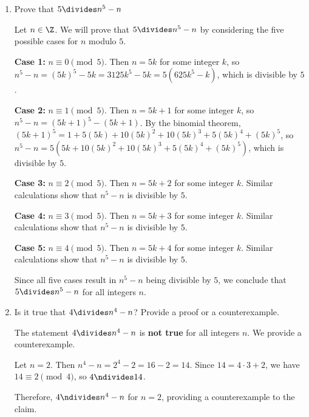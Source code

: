 \begin{enumerate}
\begin{enumerate}
\begin{subanswer}
      Since all three cases result in $n^{3} - n$ being divisible by $3$, we conclude that $3 \divides n^{3} - n$ for all integers $n$.
    \end{subanswer}
    
    \item Prove that $5\divides n^{5}-n$
    \begin{subanswer}
      Let $n \in \Z$. We will prove that $5 \divides n^{5} - n$ by considering the five possible cases for $n$ modulo $5$.
      
      \textbf{Case 1:} $n \equiv 0 \pmod{5}$. Then $n = 5k$ for some integer $k$, so $n^{5} - n = (5k)^{5} - 5k = 3125k^{5} - 5k = 5(625k^{5} - k)$, which is divisible by $5$.
      
      \textbf{Case 2:} $n \equiv 1 \pmod{5}$. Then $n = 5k + 1$ for some integer $k$, so $n^{5} - n = (5k + 1)^{5} - (5k + 1)$. By the binomial theorem, $(5k + 1)^{5} = 1 + 5(5k) + 10(5k)^{2} + 10(5k)^{3} + 5(5k)^{4} + (5k)^{5}$, so $n^{5} - n = 5(5k + 10(5k)^{2} + 10(5k)^{3} + 5(5k)^{4} + (5k)^{5})$, which is divisible by $5$.
      
      \textbf{Case 3:} $n \equiv 2 \pmod{5}$. Then $n = 5k + 2$ for some integer $k$. Similar calculations show that $n^{5} - n$ is divisible by $5$.
      
      \textbf{Case 4:} $n \equiv 3 \pmod{5}$. Then $n = 5k + 3$ for some integer $k$. Similar calculations show that $n^{5} - n$ is divisible by $5$.
      
      \textbf{Case 5:} $n \equiv 4 \pmod{5}$. Then $n = 5k + 4$ for some integer $k$. Similar calculations show that $n^{5} - n$ is divisible by $5$.
      
      Since all five cases result in $n^{5} - n$ being divisible by $5$, we conclude that $5 \divides n^{5} - n$ for all integers $n$.
    \end{subanswer}
    
    \item Is it true that $4 \divides n^{4}-n$? Provide a proof or a counterexample.
    \begin{subanswer}
      The statement $4 \divides n^{4} - n$ is \textbf{not true} for all integers $n$. We provide a counterexample.
      
      Let $n = 2$. Then $n^{4} - n = 2^{4} - 2 = 16 - 2 = 14$. Since $14 = 4 \cdot 3 + 2$, we have $14 \equiv 2 \pmod{4}$, so $4 \ndivides 14$.
      
      Therefore, $4 \ndivides n^{4} - n$ for $n = 2$, providing a counterexample to the claim.
    \end{subanswer}
  \end{enumerate}


\end{enumerate}
